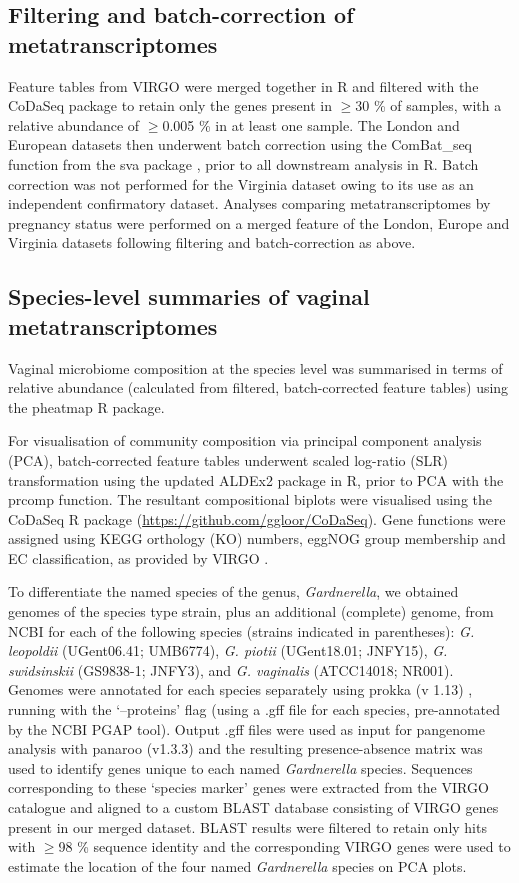 \documentclass[sn-mathphys,Numbered]{sn-jnl}%
\begin{document}
\subsection{Filtering and batch-correction of metatranscriptomes}\label{subsec:subsecAnalysis}
Feature tables from VIRGO were merged together in R and filtered with the CoDaSeq package to retain only the genes present in $\geq$30 \% of samples, with a relative abundance of $\geq$0.005 \% in at least one sample. The London and European datasets then underwent batch correction using the ComBat\_seq function from the sva package \cite{Zhang:2020ab}, prior to all downstream analysis in R. Batch correction was not performed for the Virginia dataset owing to its use as an independent confirmatory dataset. Analyses comparing metatranscriptomes by pregnancy status were performed on a merged feature of the London, Europe and Virginia datasets following filtering and batch-correction as above.

\subsection{Species-level summaries of vaginal metatranscriptomes}
Vaginal microbiome composition at the species level was summarised in terms of relative abundance (calculated from filtered, batch-corrected feature tables) using the pheatmap R package. 

For visualisation of community composition via principal component analysis (PCA), batch-corrected feature tables underwent scaled log-ratio (SLR) transformation using the updated ALDEx2 package in R, prior to PCA with the prcomp function. The resultant compositional biplots were visualised using the CoDaSeq R package (\url{https://github.com/ggloor/CoDaSeq}). Gene functions were assigned using KEGG orthology (KO) numbers, eggNOG group membership and EC classification, as provided by VIRGO \citep{Ma:2020aa}.

To differentiate the named species of the genus, \textit{Gardnerella}, we obtained genomes of the species type strain, plus an additional (complete) genome, from NCBI for each of the following species (strains indicated in parentheses): \textit{G. leopoldii} (UGent06.41; UMB6774), \textit{G. piotii} (UGent18.01; JNFY15), \textit{G. swidsinskii} (GS9838-1; JNFY3), and \textit{G. vaginalis} (ATCC14018; NR001). Genomes were annotated for each species separately using prokka (v 1.13) \cite{Seemann:2014aa}, running with the `--proteins' flag (using a .gff file for each species, pre-annotated by the NCBI PGAP tool). Output .gff files were used as input for pangenome analysis with panaroo (v1.3.3) \cite{Tonkin-Hill:2020aa} and the resulting presence-absence matrix was used to identify genes unique to each named \textit{Gardnerella} species. Sequences corresponding to these `species marker' genes were extracted from the VIRGO catalogue and aligned to a custom BLAST database consisting of VIRGO genes present in our merged dataset. BLAST results were filtered to retain only hits with $\geq$98 \% sequence identity and the corresponding VIRGO genes were used to estimate the location of the four named \textit{Gardnerella} species on PCA plots.
\end{document}

